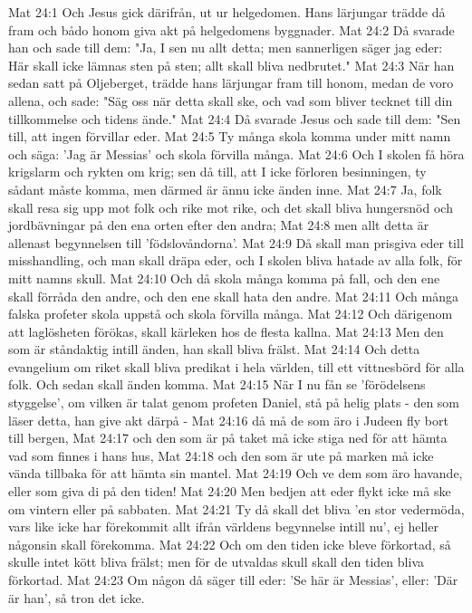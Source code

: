 Mat 24:1  Och Jesus gick därifrån, ut ur helgedomen. Hans lärjungar trädde då fram och bådo honom giva akt på helgedomens byggnader.
Mat 24:2  Då svarade han och sade till dem: "Ja, I sen nu allt detta; men sannerligen säger jag eder: Här skall icke lämnas sten på sten; allt skall bliva nedbrutet."
Mat 24:3  När han sedan satt på Oljeberget, trädde hans lärjungar fram till honom, medan de voro allena, och sade: "Säg oss när detta skall ske, och vad som bliver tecknet till din tillkommelse och tidens ände."
Mat 24:4  Då svarade Jesus och sade till dem: "Sen till, att ingen förvillar eder.
Mat 24:5  Ty många skola komma under mitt namn och säga: 'Jag är Messias' och skola förvilla många.
Mat 24:6  Och I skolen få höra krigslarm och rykten om krig; sen då till, att I icke förloren besinningen, ty sådant måste komma, men därmed är ännu icke änden inne.
Mat 24:7  Ja, folk skall resa sig upp mot folk och rike mot rike, och det skall bliva hungersnöd och jordbävningar på den ena orten efter den andra;
Mat 24:8  men allt detta är allenast begynnelsen till 'födslovåndorna'.
Mat 24:9  Då skall man prisgiva eder till misshandling, och man skall dräpa eder, och I skolen bliva hatade av alla folk, för mitt namns skull.
Mat 24:10  Och då skola många komma på fall, och den ene skall förråda den andre, och den ene skall hata den andre.
Mat 24:11  Och många falska profeter skola uppstå och skola förvilla många.
Mat 24:12  Och därigenom att laglösheten förökas, skall kärleken hos de flesta kallna.
Mat 24:13  Men den som är ståndaktig intill änden, han skall bliva frälst.
Mat 24:14  Och detta evangelium om riket skall bliva predikat i hela världen, till ett vittnesbörd för alla folk. Och sedan skall änden komma.
Mat 24:15  När I nu fån se 'förödelsens styggelse', om vilken är talat genom profeten Daniel, stå på helig plats - den som läser detta, han give akt därpå -
Mat 24:16  då må de som äro i Judeen fly bort till bergen,
Mat 24:17  och den som är på taket må icke stiga ned för att hämta vad som finnes i hans hus,
Mat 24:18  och den som är ute på marken må icke vända tillbaka för att hämta sin mantel.
Mat 24:19  Och ve dem som äro havande, eller som giva di på den tiden!
Mat 24:20  Men bedjen att eder flykt icke må ske om vintern eller på sabbaten.
Mat 24:21  Ty då skall det bliva 'en stor vedermöda, vars like icke har förekommit allt ifrån världens begynnelse intill nu', ej heller någonsin skall förekomma.
Mat 24:22  Och om den tiden icke bleve förkortad, så skulle intet kött bliva frälst; men för de utvaldas skull skall den tiden bliva förkortad.
Mat 24:23  Om någon då säger till eder: 'Se här är Messias', eller: 'Där är han', så tron det icke.

